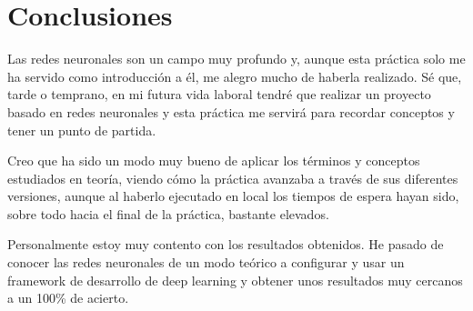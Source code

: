 \chapter{Conclusiones}
\label{chap:concl}

Las redes neuronales son un campo muy profundo y, aunque esta práctica solo me ha servido como introducción a él, me alegro mucho de haberla realizado. Sé que, tarde o temprano, en mi futura vida laboral tendré que realizar un proyecto basado en redes neuronales y esta práctica me servirá para recordar conceptos y tener un punto de partida. 

\bigskip

Creo que ha sido un modo muy bueno de aplicar los términos y conceptos estudiados en teoría, viendo cómo la práctica avanzaba a través de sus diferentes versiones, aunque al haberlo ejecutado en local los tiempos de espera hayan sido, sobre todo hacia el final de la práctica, bastante elevados.

\bigskip

Personalmente estoy muy contento con los resultados obtenidos. He pasado de conocer las redes neuronales de un modo teórico a configurar y usar un framework de desarrollo de deep learning y obtener unos resultados muy cercanos a un 100\% de acierto. 